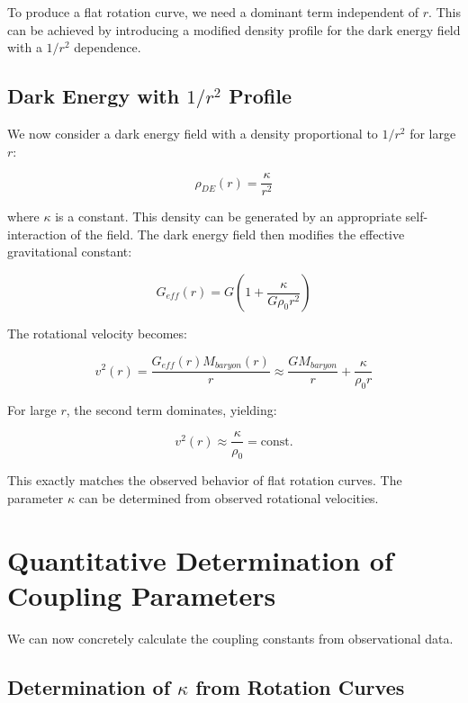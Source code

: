 \documentclass[a4paper,12pt]{article}
\begin{document}
To produce a flat rotation curve, we need a dominant term independent of $r$. This can be achieved by introducing a modified density profile for the dark energy field with a $1/r^2$ dependence.

\subsection{Dark Energy with $1/r^2$ Profile}

We now consider a dark energy field with a density proportional to $1/r^2$ for large $r$:

\begin{equation}
	\rho_{DE}(r) = \frac{\kappa}{r^2}
\end{equation}

where $\kappa$ is a constant. This density can be generated by an appropriate self-interaction of the field. The dark energy field then modifies the effective gravitational constant:

\begin{equation}
	G_{eff}(r) = G\left(1 + \frac{\kappa}{G\rho_0 r^2}\right)
\end{equation}

The rotational velocity becomes:

\begin{equation}
	v^2(r) = \frac{G_{eff}(r)M_{baryon}(r)}{r} \approx \frac{GM_{baryon}}{r} + \frac{\kappa}{\rho_0 r}
\end{equation}

For large $r$, the second term dominates, yielding:

\begin{equation}
	v^2(r) \approx \frac{\kappa}{\rho_0} = \text{const.}
\end{equation}

This exactly matches the observed behavior of flat rotation curves. The parameter $\kappa$ can be determined from observed rotational velocities.

\section{Quantitative Determination of Coupling Parameters}

We can now concretely calculate the coupling constants from observational data.

\subsection{Determination of $\kappa$ from Rotation Curves}
\end{document}
